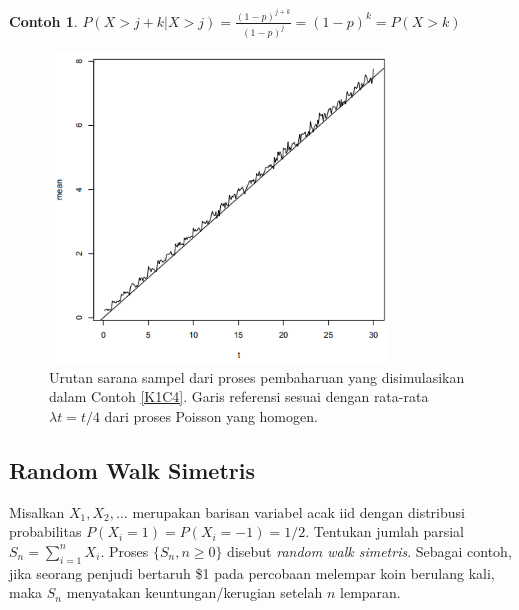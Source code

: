 \documentclass[a4paper,12pt]{article}
\theoremstyle{definition}
\newtheorem{example}{Contoh}[section]
\begin{document}
\begin{example}
$P(X>j+k|X>j)=\frac{(1-p)^{j+k}}{(1-p)^{j}}=(1-p)^{k}=P(X>k)$

\end{example}





\begin{figure}
    \centering
    \includegraphics[width=9cm]{gb/K1G1.png}
    \caption{Urutan sarana sampel dari proses pembaharuan yang disimulasikan dalam Contoh \ref{K1C4}. Garis referensi sesuai dengan rata-rata $\lambda t = t/4$ dari proses Poisson yang homogen.}
    \label{K1G1}
\end{figure}


\subsection{Random Walk Simetris}
Misalkan $X_1, X_2, ...$ merupakan barisan variabel acak iid dengan distribusi probabilitas $P(X_i = 1) = P(X_i = -1) = 1/2$. Tentukan jumlah parsial $S_n = \sum_{i=1}^{n} X_i$. Proses $\{S_n, n \geq 0\}$ disebut \textit{random walk simetris}. Sebagai contoh, jika seorang penjudi bertaruh \$1 pada percobaan melempar koin berulang kali, maka $S_n$ menyatakan keuntungan/kerugian setelah $n$ lemparan.
\end{document}
